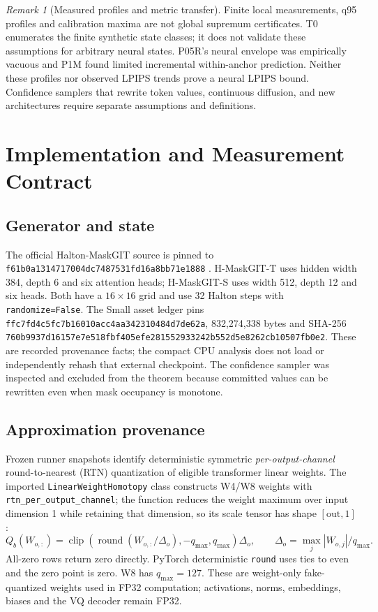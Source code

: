 \documentclass[11pt,a4paper]{article}
\theoremstyle{plain}
\theoremstyle{definition}
\theoremstyle{remark}
\newtheorem{remark}[theorem]{Remark}
\begin{document}
\begin{remark}[Measured profiles and metric transfer]
\label{rem:notcert}
Finite local measurements, q95 profiles and calibration maxima are not global
supremum certificates. T0 enumerates the finite synthetic state classes; it
does not validate these assumptions for arbitrary neural states. P05R's neural
envelope was empirically vacuous and P1M found limited incremental within-anchor
prediction. Neither these profiles nor observed LPIPS trends prove a neural
LPIPS bound. Confidence samplers that rewrite token values, continuous diffusion,
and new architectures require separate assumptions and definitions.
\end{remark}

\section{Implementation and Measurement Contract}
\label{sec:contract}
\subsection{Generator and state}
The official Halton-MaskGIT source is pinned to
\nolinkurl{f61b0a1314717004dc7487531fd16a8bb71e1888}
\citep{besnier2025halton}. H-MaskGIT-T uses hidden width 384, depth 6 and six
attention heads; H-MaskGIT-S uses width 512, depth 12 and six heads.
Both have a $16\times16$ grid and use 32 Halton steps with
\texttt{randomize=False}. The Small asset ledger pins
\nolinkurl{ffc7fd4c5fc7b16010acc4aa342310484d7de62a},
832,274,338 bytes and SHA-256
\nolinkurl{760b9937d16157e7e518fbf405efe281552933242b552d5e8262cb10507fb0e2}.
These are recorded provenance facts; the compact CPU analysis does not load
or independently rehash that external checkpoint.
The confidence sampler was inspected and excluded from the theorem because
committed values can be rewritten even when mask occupancy is monotone.

\subsection{Approximation provenance}
\label{sec:quantizer}
Frozen runner snapshots identify deterministic symmetric
\emph{per-output-channel} round-to-nearest (RTN) quantization of eligible
transformer linear weights. The imported \texttt{LinearWeightHomotopy} class
constructs W4/W8 weights with \texttt{rtn\_per\_output\_channel}; the function
reduces the weight maximum over input dimension 1 while retaining that dimension,
so its scale tensor has shape $[\mathrm{out},1]$:
\[
 Q_b(W_{o,:})=\operatorname{clip}\!\left(
 \operatorname{round}(W_{o,:}/\Delta_o),-q_{\max},q_{\max}\right)\Delta_o,
 \qquad \Delta_o=\max_j|W_{o,j}|/q_{\max}.
\]
All-zero rows return zero directly. PyTorch deterministic \texttt{round}
uses ties to even and the zero point is zero. W8 has $q_{\max}=127$.
These are weight-only fake-quantized weights used in FP32 computation;
activations, norms, embeddings, biases and the VQ decoder remain FP32.
\end{document}
